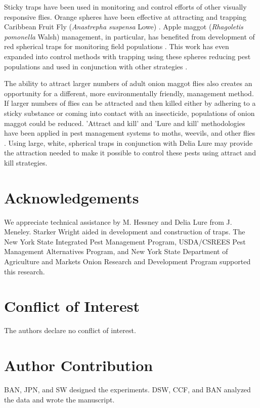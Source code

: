 \documentclass[alpha-refs]{wiley-article}
\begin{document}
Sticky traps have been used in monitoring and control efforts of other visually responsive flies.  Orange spheres have been effective at attracting and trapping Caribbean Fruit Fly (\textit{Anastrepha suspensa} Lowe) \citep{sivinski1990colored}.  Apple maggot (\textit{Rhagoletis pomonella} Walsh) management, in particular, has benefited from development of red spherical traps for monitoring field populations \citep{prokopy1975apple, drummond1984comparative, duan1994apple}.  This work has even expanded into control methods with trapping using these spheres reducing pest populations and used in conjunction with other strategies \citep{bostanian1999managing}.  

The ability to attract larger numbers of adult onion maggot flies also creates an opportunity for a different, more environmentally friendly, management method. If larger numbers of flies can be attracted and then killed either by adhering to a sticky substance or coming into contact with an insecticide, populations of onion maggot could be reduced.  'Attract and kill' and 'Lure and kill' methodologies have been applied in pest management systems to moths, weevils, and other flies \citep{el2009potential,el2011bait,navarro2013efficacy,charmillot2000attract}.  Using large, white, spherical traps in conjunction with Delia Lure may provide the attraction needed to make it possible to control these pests using attract and kill strategies.  



\section*{Acknowledgements}
We appreciate technical assistance by M. Hessney and Delia Lure from J. Meneley. Starker Wright aided in development and construction of traps.  The New York State Integrated Pest Management Program, USDA/CSREES Pest Management Alternatives Program, and New York State Department of Agriculture and Markets Onion Research and Development Program supported this research.  

\section*{Conflict of Interest}
The authors declare no conflict of interest.  

\section*{Author Contribution}
BAN, JPN, and SW designed the experiments.  DSW, CCF, and BAN analyzed the data and wrote the manuscript.  
\end{document}
